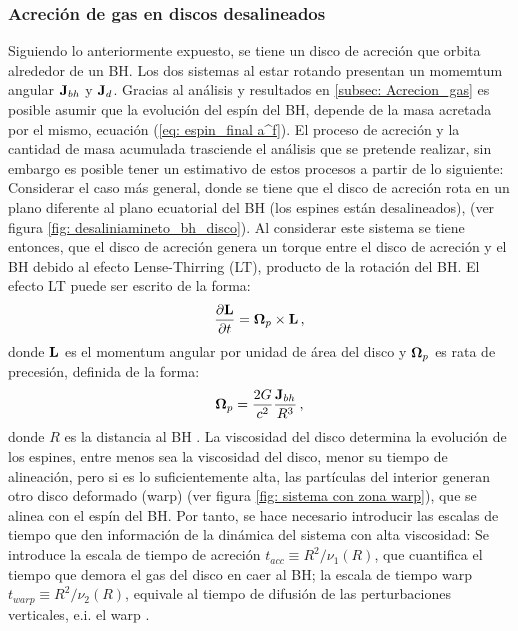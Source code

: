    \subsubsection{Acreción de gas en discos desalineados}
    \label{subsubsec: Acrecion gas desaliniado}
Siguiendo lo anteriormente expuesto, se tiene un disco de acreción que orbita alrededor de un BH. Los dos sistemas al estar rotando presentan un momemtum angular ${\bf{J}}_{bh}$ y ${\bf{J}}_{d}$. Gracias al análisis y resultados en \ref{subsec: Acrecion_gas} es posible asumir que la evolución del espín del BH, depende de la masa acretada por el mismo, ecuación (\ref{eq: espin_final a^f}). El proceso de acreción y la cantidad de masa acumulada trasciende el análisis que se pretende realizar, sin embargo es posible tener un estimativo de estos procesos a partir de lo siguiente: Considerar el caso más general, donde se tiene que el disco de acreción rota en un plano diferente al plano ecuatorial del BH (los espines están desalineados), (ver figura \ref{fig: desaliniamineto_bh_disco}). 
Al considerar este sistema se tiene entonces, que el disco de acreción genera un torque entre el disco de acreción y el BH debido al efecto Lense-Thirring (LT), producto de la rotación del BH. El efecto LT puede ser escrito de la forma:
%
\begin{align}
    \frac{\partial {\bf{L}}}{\partial t}={\bf{\Omega}}_{p}\times{\bf{L}}\,,
    \label{eq: lense-Thirring}
\end{align}
%
donde ${\bf{L}}$ es el momentum angular por unidad de área del disco y ${\bf{\Omega}}_{p}$ es rata de precesión, definida de la forma:
%
\begin{align}
    {\bf{\Omega}}_{p}=\frac{2G}{c^{2}}\frac{{\bf{J}}_{bh}}{R^{3}}\,,
\end{align}
%
donde $R$ es la distancia al BH \cite{pringle1992}. 
La viscosidad del disco determina la evolución de los espines, entre menos sea la viscosidad del disco, menor su tiempo de alineación, pero si es lo suficientemente alta, las partículas del interior generan otro disco deformado (warp) (ver figura \ref{fig: sistema con zona warp}), que se alinea con el espín del BH. Por tanto, se hace necesario introducir las escalas de tiempo que den información de la dinámica del sistema con alta viscosidad: Se introduce la escala de tiempo de acreción $t_{acc}\equiv R^{2}/\nu_{1}(R)$, que cuantifica el tiempo que demora el gas del disco en caer al BH; la escala de tiempo warp $t_{warp}\equiv R^{2}/\nu_{2}(R)$,  equivale al tiempo de difusión de las perturbaciones verticales, e.i. el warp \cite{Bustamante2018b}. 
